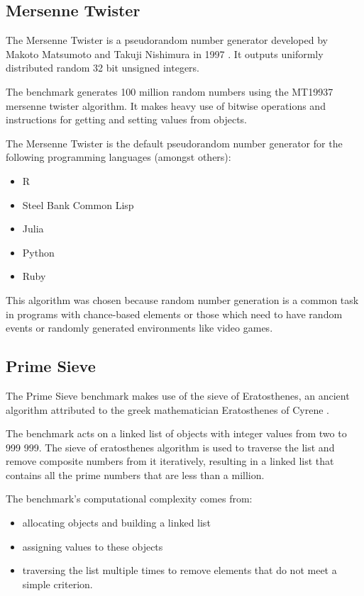 \documentclass[english,a4paper,12pt]{report}
\begin{document}
\subsection{Mersenne Twister}
The Mersenne Twister is a pseudorandom number generator developed by
Makoto Matsumoto and Takuji Nishimura in 1997 \cite{Matsumoto}. It
outputs uniformly distributed random 32 bit unsigned integers.

The benchmark generates 100 million random numbers using the MT19937
mersenne twister algorithm. It makes heavy use of bitwise operations
and instructions for getting and setting values from objects.

The Mersenne Twister is the default pseudorandom number generator for
the following programming languages (amongst others):
\begin{itemize}
	\item R \cite{R}
	\item Steel Bank Common Lisp \cite{SBCL}
	\item Julia \cite{Julia}
	\item Python \cite{Python}
	\item Ruby \cite{Ruby}
\end{itemize}

This algorithm was chosen because random number generation is a common
task in programs with chance-based elements or those which need to
have random events or randomly generated environments like video
games.

\subsection{Prime Sieve}

The Prime Sieve benchmark makes use of the sieve of Eratosthenes, an
ancient algorithm attributed to the greek mathematician Eratosthenes
of Cyrene \cite{sieve}.

The benchmark acts on a linked list of objects with integer values
from two to 999 999. The sieve of eratosthenes algorithm is used to
traverse the list and remove composite numbers from it iteratively,
resulting in a linked list that contains all the prime numbers that
are less than a million.

The benchmark's computational complexity comes from:
\begin{itemize}
\item allocating objects and building a linked list
\item assigning values to these objects
\item traversing the list multiple times to remove elements that do
  not meet a simple criterion.
\end{itemize}
\end{document}
